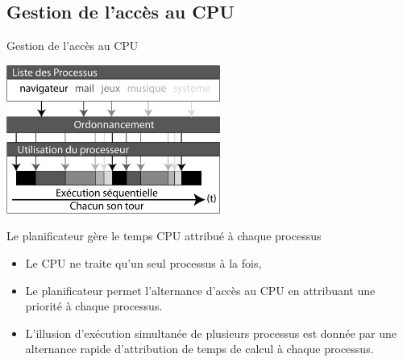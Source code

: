 \subsection{Gestion de l'accès au CPU}
\begin{frame}{Gestion de l'accès au CPU}
  \begin{center}
    \includegraphics[width=7cm]{img/s03/Planificateur.jpg}
  \end{center}
  \begin{block}{Le planificateur gère le temps CPU attribué à chaque
      processus}
    \begin{itemize}
    \item Le CPU ne traite qu'un seul processus à la fois,
    \item Le planificateur permet l'alternance d'accès au CPU en
      attribuant une priorité à chaque processus.
    \item L'illusion d'exécution simultanée de plusieurs processus est
      donnée par une alternance rapide d'attribution de temps de calcul
      à chaque processus.
    \end{itemize}
  \end{block}
\end{frame}

 

